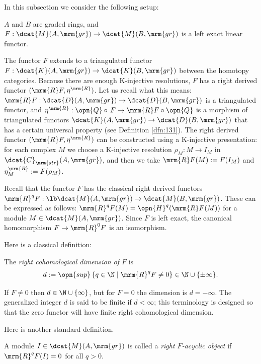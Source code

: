 In this subsection we consider the following setup:

\begin{setup} \label{set:4075}
$A$ and $B$ are graded rings, and 
$F : \dcat{M}(A, \mrm{gr}) \to \dcat{M}(B, \mrm{gr})$
is a left exact linear functor. 
\end{setup}

The functor $F$ extends to a triangulated functor
$F : \dcat{K}(A, \mrm{gr}) \to \dcat{K}(B, \mrm{gr})$
between the homotopy categories. Because there are enough K-injective 
resolutions, $F$ has a right derived functor 
$(\mrm{R} F, \eta^{\mrm{R}})$. Let us recall what this means: 
$\mrm{R} F : \dcat{D}(A, \mrm{gr}) \to \dcat{D}(B, \mrm{gr})$
is a triangulated functor, and 
$\eta^{\mrm{R}} : \opn{Q} \circ \, F \to \mrm{R} F \circ \opn{Q}$
is a morphism of triangulated functors 
$\dcat{K}(A, \mrm{gr}) \to \dcat{D}(B, \mrm{gr})$
that has a certain universal property (see Definition \ref{dfn:131}). 
The right derived functor $(\mrm{R} F, \eta^{\mrm{R}})$
can be constructed using a K-injective presentation: for each complex $M$ 
we choose a K-injective resolution 
$\rho_M : M \to I_M$
in $\dcat{C}_{\mrm{str}}(A, \mrm{gr})$, and then we take 
$\mrm{R} F(M) := F(I_M)$ and $\eta^{\mrm{R}}_M := F(\rho_M)$. 

Recall that the functor $F$ has the classical right derived functors  
$\mrm{R}^q F : \lb \dcat{M}(A, \mrm{gr}) \to \dcat{M}(B, \mrm{gr})$.
These can be expressed as follows: 
$\mrm{R}^q F(M) = \opn{H}^q(\mrm{R} F(M))$ 
for a module $M \in \dcat{M}(A, \mrm{gr})$. 
Since $F$ is left exact, the canonical homomorphism 
$F \to \mrm{R}^0 F$ is an isomorphism. 

Here is a classical definition:

\begin{dfn} \label{dfn:3885}
The {\em right cohomological dimension of $F$} 
is 
\[ d := \opn{sup} \, \{ q \in \N \mid \mrm{R}^q F \neq 0 \} \in 
\N \cup \{ \pm \infty \} . \]
\end{dfn}

If $F \neq 0$ then $d \in \N \cup \{ \infty \}$, but for $F = 0$ the 
dimension is $d = -\infty$. The generalized integer $d$ is said to be finite 
if $d < \infty$; this terminology is designed so that the zero functor will 
have finite right cohomological dimension. 

Here is another standard definition. 

\begin{dfn} \label{dfn:3887}
A module $I \in \dcat{M}(A, \mrm{gr})$ is called a {\em right $F$-acyclic 
object} if $\mrm{R}^q F(I) = 0$ for all $q > 0$. 
\end{dfn}

